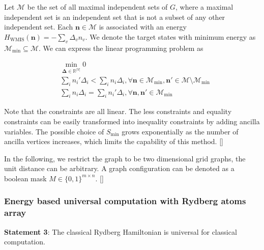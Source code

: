 \documentclass[twocolumn,superscriptaddress,english,showpacs,longbibliography]{revtex4-2}
\newcommand{\jgl}[1]{[{\color{blue}{JGL: #1}}]}
\begin{document}
Let $\mathcal{M}$ be the set of all maximal independent sets of $G$, where a maximal independent set is an independent set that is not a subset of any other independent set.
Each $\mathbf n \in \mathcal{M}$ is associated with an energy $H_{\text{WMIS}}(\mathbf n) = -\sum_v \Delta_v n_v$. We denote the target states with minimum energy as $\mathcal{M}_{\text{min}} \subseteq \mathcal{M}$. We can express the linear programming problem as

\begin{equation}
    \begin{split}
        &\min_{\boldsymbol{\Delta} \in \mathbb{R}^{|V|}} 0\\
        &\sum_i n_i' \Delta_i < \sum_i n_i \Delta_i, \forall \mathbf n \in \mathcal{M}_{\text{min}}, \mathbf n' \in \mathcal{M} \setminus \mathcal{M}_{\text{min}}\\
        &\sum_i n_i \Delta_i = \sum_i n_i' \Delta_i, \forall \mathbf n, \mathbf n' \in \mathcal{M}_{\text{min}}
    \end{split}
\end{equation}

Note that the constraints are all linear. The less constraints and equality constraints can be easily transformed into inequality constraints by adding ancilla variables.
The possible choice of $S_{\text{min}}$ grows exponentially as the number of ancilla vertices increases, which limits the capability of this method.
\jgl{We focus on the general graphs first.}

In the following, we restrict the graph to be two dimensional grid graphs, the unit distance can be arbitrary. A graph configuration can be denoted as a boolean mask $M\in \{0, 1\}^{m\times n}$.
\jgl{Then the unit disk graphs.}

\subsubsection{Energy based universal computation with Rydberg atoms
array}\label{energy-based-universal-computation-with-rydberg-atoms-array}

\textbf{Statement 3}: The classical Rydberg Hamiltonian is universal for classical computation.
\end{document}
